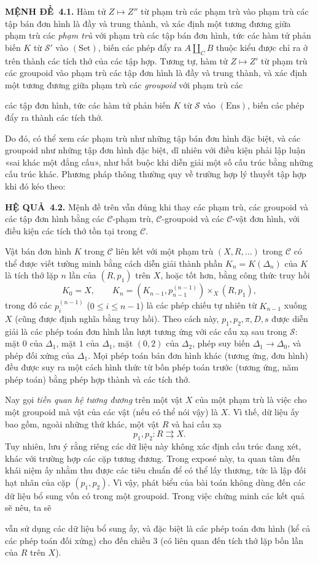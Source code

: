 \documentclass[11pt,twoside,openany]{book}
\numberwithin{equation}{section}
\newcommand{\src}[1]{%
  \phantomsection\hypertarget{src:\fgasourceid:#1}{}%
  \marginpar{\raggedleft\footnotesize\sffamily #1}%
}
\newcommand{\fgasourceid}{unset}
\newcommand{\result}[2]{\par\medskip\noindent\textbf{#1\if\relax\detokenize{#2}\relax\else\ #2\fi.}\quad}
\begin{document}
\result{MỆNH ĐỀ}{4.1} Hàm tử $Z\longmapsto Z''$ từ phạm trù các phạm trù vào
phạm trù các tập bán đơn hình là đầy và trung thành, và xác định một tương
đương giữa phạm trù các \emph{phạm trù} với phạm trù các tập bán đơn hình,
tức các hàm tử phản biến $K$ từ $\mathcal S'$ vào $(\mathrm{Set})$, biến các
phép đẩy ra $A\amalg_C B$ thuộc kiểu được chỉ ra ở trên thành các tích thớ của
các tập hợp. Tương tự, hàm tử $Z\longmapsto Z'$ từ phạm trù các groupoid vào
phạm trù các tập đơn hình là đầy và trung thành, và xác định một tương
đương giữa phạm trù các \emph{groupoid} với phạm trù các
\src{109}
các tập đơn hình, tức các hàm tử phản biến $K$ từ $\mathcal S$ vào
$(\mathrm{Ens})$, biến các phép đẩy ra thành các tích thớ.

Do đó, có thể xem các phạm trù như những tập bán đơn hình đặc biệt, và các
groupoid như những tập đơn hình đặc biệt, dĩ nhiên với điều kiện phải lập luận
«sai khác một đẳng cấu», như bắt buộc khi diễn giải một số cấu trúc bằng những
cấu trúc khác. Phương pháp thông thường quy về trường hợp lý thuyết tập hợp
khi đó kéo theo:

\result{HỆ QUẢ}{4.2} Mệnh đề trên vẫn đúng khi thay các phạm trù, các
groupoid và các tập đơn hình bằng các $\mathcal C$-phạm trù,
$\mathcal C$-groupoid và các $\mathcal C$-vật đơn hình, với điều kiện các tích
thớ tồn tại trong $\mathcal C$.

Vật bán đơn hình $K$ trong $\mathcal C$ liên kết với một phạm trù
$(X,R,\ldots)$ trong $\mathcal C$ có thể được viết tường minh bằng cách diễn
giải thành phần $K_n=K(\Delta_n)$ của $K$ là tích thớ lặp $n$ lần của
$(R,p_1)$ trên $X$, hoặc tốt hơn, bằng công thức truy hồi
\[
  K_0=X,\qquad
  K_n=(K_{n-1},p_{n-1}^{(n-1)})\times_X(R,p_1),
\]
trong đó các $p_i^{(n-1)}$ ($0\leq i\leq n-1$) là các phép chiếu tự nhiên từ
$K_{n-1}$ xuống $X$ (cũng được định nghĩa bằng truy hồi). Theo cách này,
$p_1,p_2,\pi,D,s$ được diễn giải là các phép toán đơn hình lần lượt tương ứng
với các cấu xạ sau trong $\mathcal S$: mặt $0$ của $\Delta_1$, mặt $1$ của
$\Delta_1$, mặt $(0,2)$ của $\Delta_2$, phép suy biến
$\Delta_1\to\Delta_0$, và phép đối xứng của $\Delta_1$. Mọi phép toán bán đơn
hình khác (tương ứng, đơn hình) đều được suy ra một cách hình thức từ bốn
phép toán trước (tương ứng, năm phép toán) bằng phép hợp thành và các tích thớ.

Nay gọi \emph{tiền quan hệ tương đương} trên một vật $X$ của một phạm trù là
việc cho một groupoid mà vật của các vật (nếu có thể nói vậy) là $X$. Vì thế,
dữ liệu ấy bao gồm, ngoài những thứ khác, một vật $R$ và hai cấu xạ
\[
  p_1,p_2:R\rightrightarrows X.
\]
Tuy nhiên, lưu ý rằng riêng các dữ liệu này không xác định cấu trúc đang xét,
khác với trường hợp các cặp tương đương. Trong exposé này, ta quan tâm đến
khái niệm ấy nhằm thu được các tiêu chuẩn để có thể lấy thương, tức là lập đối
hạt nhân của cặp $(p_1,p_2)$. Vì vậy, phát biểu của bài toán không dùng đến
các dữ liệu bổ sung vốn có trong một groupoid. Trong việc chứng minh các kết
quả sẽ nêu, ta sẽ
\src{110}
vẫn sử dụng các dữ liệu bổ sung ấy, và đặc biệt là các phép toán đơn hình
(kể cả các phép toán đối xứng) cho đến chiều $3$ (có liên quan đến tích thớ
lặp bốn lần của $R$ trên $X$).
\end{document}
